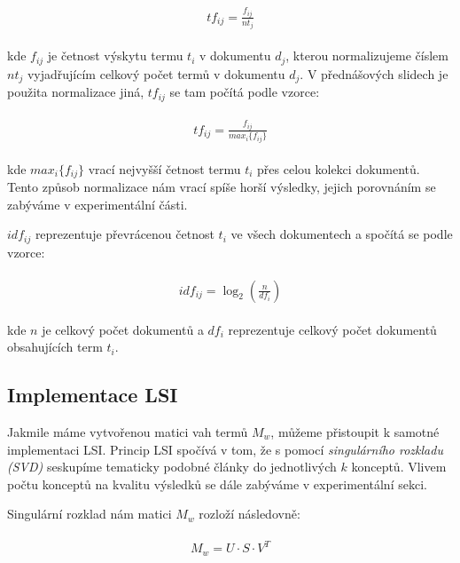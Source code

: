 \documentclass[11pt]{scrartcl} %
\begin{document}
\begin{align}
	\begin{split}
		tf_{ij} = \frac{f_{ij}}{nt_j}
	\end{split}					
\end{align}

kde $f_{ij}$ je četnost výskytu termu $t_i$ v dokumentu $d_j$, kterou normalizujeme číslem $nt_j$ vyjadřujícím celkový počet termů v dokumentu $d_j$. V přednášových slidech je použita normalizace jiná, $tf_{ij}$ se tam počítá podle vzorce:

\begin{align}
	\begin{split}
		tf_{ij} = \frac{f_{ij}}{max_i\{f_{ij}\}}
	\end{split}					
\end{align}

kde $max_i\{f_{ij}\}$ vrací nejvyšší četnost termu $t_i$ přes celou kolekci dokumentů. Tento způsob normalizace nám vrací spíše horší výsledky, jejich porovnáním se zabýváme v experimentální části.

$idf_{ij}$ reprezentuje převrácenou četnost $t_i$ ve všech dokumentech a spočítá se podle vzorce:

\begin{align}
	\begin{split}
		idf_{ij} = \log_2 (\frac{n}{df_i})
	\end{split}					
\end{align}

kde $n$ je celkový počet dokumentů a $df_i$ reprezentuje celkový počet dokumentů obsahujících term $t_i$.

\subsection{Implementace LSI}

Jakmile máme vytvořenou matici vah termů $M_w$, můžeme přistoupit k samotné implementaci LSI. Princip LSI spočívá v tom, že s pomocí \emph{singulárního rozkladu (SVD)} seskupíme tematicky podobné články do jednotlivých $k$ konceptů. Vlivem počtu konceptů na kvalitu výsledků se dále zabýváme v experimentální sekci.

\bigskip 

Singulární rozklad nám matici $M_w$ rozloží následovně:

\begin{align}
	\begin{split}
		M_w = U \cdot S \cdot V^T
	\end{split}					
\end{align}
\end{document}
